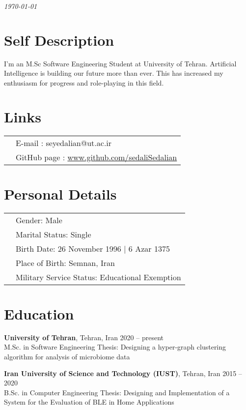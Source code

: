 \documentclass[margin,line]{res}
\begin{document}
 \hfill {\em \today}

\begin{resume}
\section{\sc Self Description }
I'm an M.Sc Software Engineering Student at University of Tehran. Artificial Intelligence is building our future more than ever. This has increased my enthusiasm for progress and role-playing in this field. 
\section{\sc Links}
\vspace{.05in}
\begin{tabular}{@{}p{3.5in}p{3in}}
& {E-mail :}  seyedalian@ut.ac.ir\\
& {GitHub page :}  \url{www.github.com/sedaliSedalian}

\end{tabular}
\section{\sc Personal Details}
\begin{tabular}{@{}p{3.5in}p{3in}}
	& {Gender:}  Male \\
	& {Marital Status:} Single \\
	& {Birth Date:}  26 November 1996   |   6 Azar 1375\\
	& {Place of Birth:} Semnan, Iran\\
	& {Military Service Status:} Educational Exemption 
\end{tabular}

\section{\sc Education}
{\bf University of Tehran}, Tehran, Iran \hfill 2020 -- present\\
M.Sc. in Software Engineering 
Thesis: Designing a hyper-graph clustering algorithm for analysis of microbiome data


{\bf Iran University of  Science and Technology (IUST)}, Tehran, Iran \hfill 2015 -- 2020\\
B.Sc. in Computer Engineering 
Thesis: Designing and Implementation of a System for the Evaluation of BLE in Home Applications



\end{resume}
\end{document}

